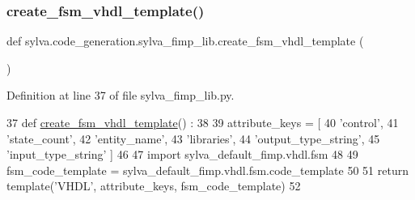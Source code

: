 \subsubsection{\texorpdfstring{create\+\_\+fsm\+\_\+vhdl\+\_\+template()}{create\_fsm\_vhdl\_template()}}
{\footnotesize\ttfamily def sylva.\+code\+\_\+generation.\+sylva\+\_\+fimp\+\_\+lib.\+create\+\_\+fsm\+\_\+vhdl\+\_\+template (\begin{DoxyParamCaption}{ }\end{DoxyParamCaption})}



Definition at line 37 of file sylva\+\_\+fimp\+\_\+lib.\+py.


\begin{DoxyCode}
37   \textcolor{keyword}{def }\hyperlink{namespacesylva_1_1code__generation_1_1sylva__fimp__lib_a6deb8050547dff049bdfca46b07ba242}{create\_fsm\_vhdl\_template}() :
38 
39     attribute\_keys = [
40       \textcolor{stringliteral}{'control'},
41       \textcolor{stringliteral}{'state\_count'},
42       \textcolor{stringliteral}{'entity\_name'},
43       \textcolor{stringliteral}{'libraries'},
44       \textcolor{stringliteral}{'output\_type\_string'},
45       \textcolor{stringliteral}{'input\_type\_string'} ]
46 
47     \textcolor{keyword}{import} sylva\_default\_fimp.vhdl.fsm
48 
49     fsm\_code\_template = sylva\_default\_fimp.vhdl.fsm.code\_template
50 
51     \textcolor{keywordflow}{return} template(\textcolor{stringliteral}{'VHDL'}, attribute\_keys, fsm\_code\_template)
52 
\end{DoxyCode}
\mbox{\label{namespacesylva_1_1code__generation_1_1sylva__fimp__lib_ab22b6972c355f4ffbd4a498e417c9928}} 
